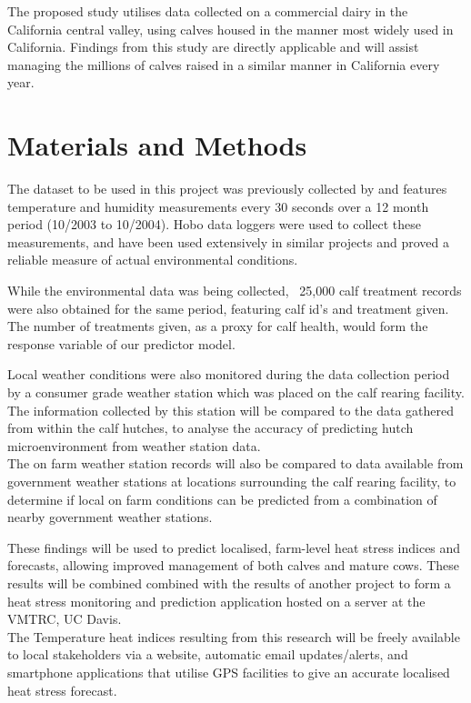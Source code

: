 \documentclass[12pt]{article}
\begin{document}
	The proposed study  utilises data collected on a commercial dairy in the California central valley, using calves housed in the manner most widely used in California. Findings from this study are directly applicable and will assist managing the millions of calves raised in a similar manner in California every year. %

	\newpage
	\section{Materials and Methods}
		The dataset to be used in this project was previously collected by %
		and features temperature and humidity measurements every 30 seconds over a 12 month period (10/2003 to 10/2004). 
		Hobo data loggers\cite{Onset2012} were used to collect these measurements, and have been used extensively in similar projects and proved a reliable measure of actual environmental conditions\cite{Scharf2011,Jousan2007}.


		While the environmental data was being collected, ~25,000 calf treatment records were also obtained for the same period, featuring calf id's and treatment given. %
		The number of treatments given, as a proxy for calf health, would form the response variable of our predictor model. %


		Local weather conditions were also monitored during the data collection period by a consumer grade weather station which was placed on the calf rearing facility. The information collected by this station will be compared to the data gathered from within the calf hutches, to analyse the accuracy of predicting hutch microenvironment from weather station data.\\ 
		The on farm weather station records will also be compared to data available from government weather stations at locations surrounding the calf rearing facility\cite{NOAA2012}, to determine if local on farm conditions can be predicted from a combination of nearby government weather stations. 


		These findings will be used to predict localised, farm-level heat stress indices and forecasts, allowing improved management of both calves and mature cows.
		These results will be combined combined with the results of another project %
		to form a heat stress monitoring and prediction application hosted on a server at the VMTRC, UC Davis. \\
		The Temperature heat indices resulting from this research will be freely available to local stakeholders via a website, automatic email updates/alerts, and smartphone applications that utilise GPS facilities to give an accurate localised heat stress forecast.


	\newpage
	
	
\end{document}
